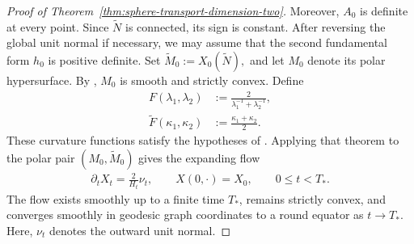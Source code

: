 \documentclass[11pt,reqno]{amsart}
\numberwithin{equation}{section}
\theoremstyle{definition}
\theoremstyle{remark}
\newcommand{\0}{\emptyset}
\begin{document}
\begin{proof}[Proof of Theorem~\ref{thm:sphere-transport-dimension-two}]
Moreover, $A_0$ is definite at every point. Since $\widetilde N$ is
connected, its sign is constant. After reversing the global unit normal
if necessary, we may assume that the second fundamental form $h_0$ is
positive definite. Set $ \widetilde M_0:=X_0(\widetilde N),$ and let $M_0$ denote its polar hypersurface. By \cite[Section~4]{gerhardt2015curvature}, $M_0$ is smooth and strictly
convex. Define
\begin{align}
        F(\lambda_1,\lambda_2)
        &:=
        \frac{2}{
        \lambda_1^{-1}+\lambda_2^{-1}
        },
        \\
        \widetilde F(\kappa_1,\kappa_2)
        &:=
        \frac{\kappa_1+\kappa_2}{2}.
\end{align}
These curvature functions satisfy the hypotheses of
\cite[Theorem~1.1]{gerhardt2015curvature}. Applying that theorem to the
polar pair $(M_0,\widetilde M_0)$ gives the expanding flow
\begin{align}\label{eq:sphere-transport-dimension-two-flow}
        \partial_tX_t
        =
        \frac{2}{H_t}\nu_t,
        \qquad
        X(0,\cdot)
        =
        X_0,
        \qquad
        0\leq t<T_*.
\end{align}
The flow exists smoothly up to a finite time $T_*$, remains strictly
convex, and converges smoothly in geodesic graph coordinates to a round
equator as $t\to T_*$. Here, $\nu_t$ denotes the outward unit normal.


\end{proof}
\end{document}
